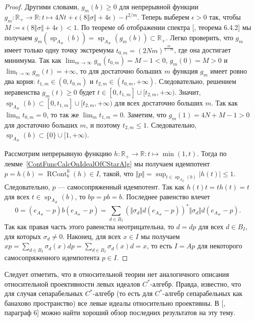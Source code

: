 \begin{proof}
Другими словами, $g_m(b)\geq 0$ для непрерывной функции
$g_m:\mathbb{R}_+\to\mathbb{R}:t\mapsto
4Nt+\epsilon(8\Vert\sigma\Vert+4\epsilon)-t^{2/m}$. Теперь выберем $\epsilon>0$
так, чтобы $M:=\epsilon(8\Vert\sigma\Vert+4\epsilon)<1$. По теореме об
отображении спектра [\cite{HelLectAndExOnFuncAn}, теорема 6.4.2] мы получаем
$g_m(\operatorname{sp}_{A_\#}(b))
=\operatorname{sp}_{A_\#}(g_m(b))\subset\mathbb{R}_+$.
Легко проверить, что $g_m$ имеет только одну точку экстремума
$t_{0,m}={(2Nm)}^{\frac{m}{2-m}}$, где она достигает минимума. Так как
$\lim_{m\to\infty} g_m(t_{0,m})=M-1<0$, $g_m(0)=M>0$ и $\lim_{t\to\infty}
g_m(t)=+\infty$, то для достаточно больших $m$ функция $g_m$ имеет ровно два
корня: $t_{1,m}\in(0,t_{0,m})$ и $t_{2,m}\in(t_{0,m},+\infty)$. Следовательно,
решением неравенства $g_m(t)\geq 0$ будет
$t\in[0,t_{1,m}]\cup[t_{2,m},+\infty)$. Значит,  %
$\operatorname{sp}_{A_\#}(b)\subset[0,t_{1,m}]\cup[t_{2,m},+\infty)$  %
для всех достаточно больших $m$. Так как $\lim_m t_{0,m}=0$, то так же 
$\lim_m t_{1,m}=0$. Заметим, что $g_m(1)=4N+M-1>0$ для достаточно больших 
$m$, и поэтому $t_{2,m}\leq 1$. Следовательно, 
$\operatorname{sp}_{A_\#}(b)\subset \{0 \}\cup[1,+\infty)$.  %

Рассмотрим непрерывную функцию $h:\mathbb{R}_+\to\mathbb{R}:t\mapsto\min(1, t)$.
Тогда по лемме~\ref{ContFuncCalcOnIdealOfCStarAlg} мы получаем идемпотент
$p=h(b)=\operatorname{RCont}_b^0(h)\in I$, такой, что $\Vert
p\Vert=\sup_{t\in\operatorname{sp}_{A_\#}(b)}|h(t)|\leq 1$. Следовательно, $p$
--- самосопряженный идемпотент. Так как $h(t)t=th(t)=t$ для всех $t\in
\operatorname{sp}_{A_\#}(b)$, то $bp=pb=b$. Последнее равенство влечет
$$
0=(e_{A_\#}-p)b(e_{A_\#}-p)
=\sum_{d\in B_I}
{(\Vert\sigma_d\Vert d(e_{A_\#}-p))}^*\Vert\sigma_d\Vert d(e_{A_\#}-p).
$$
Так как правая часть этого равенства неотрицательна, то $d=dp$ для всех 
$d\in B_I$, для которых $\sigma_d\neq 0$. Наконец, для всех $x\in I$ мы получаем
$xp=\sum_{d\in B_I}\sigma_d(x)dp=\sum_{d\in B_I}\sigma_d(x)d=x$, то есть $I=Ap$
для некоторого самосопряженного идемпотента $p\in I$.
\end{proof}

Следует отметить, что в относительной теории нет аналогичного описания
относительной проективности левых идеалов $C^*$-алгебр. Правда, известно, что
для случая сепарабельных $C^*$-алгебр (то есть для $C^*$-алгебр сепарабельных
как банахово пространство) все левые идеалы относительно проективны. В
[\cite{LykProjOfBanAndCStarAlgsOfContFld}, параграф 6] можно найти хороший обзор
последних результатов на эту тему.

